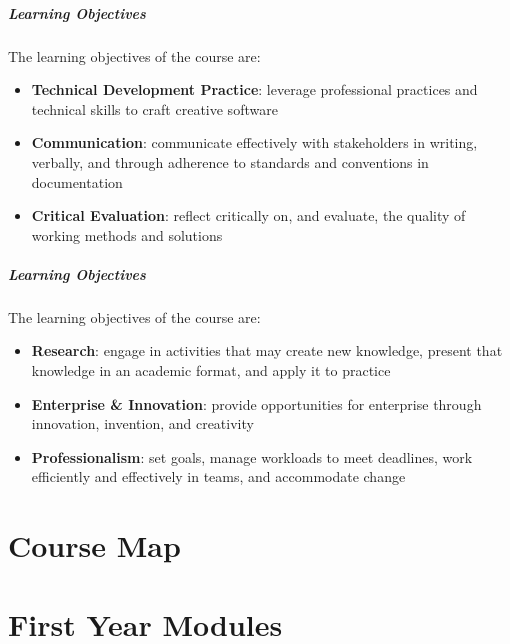 
\begin{frame}
	\frametitle{Learning Objectives}
	
	The learning objectives of the course are:
	
	\begin{itemize}
		\item \textbf{Technical Development Practice}: leverage professional practices and technical skills to craft creative software \pause
		\item \textbf{Communication}: communicate effectively with stakeholders in writing, verbally, and through adherence to standards and conventions in documentation \pause
		\item \textbf{Critical Evaluation}: reflect critically on, and evaluate, the quality of working methods and solutions
	\end{itemize}
\end{frame}

\begin{frame}
	\frametitle{Learning Objectives}
	
	The learning objectives of the course are:
	
	\begin{itemize}
		\item \textbf{Research}: engage in activities that may create new knowledge, present that knowledge in an academic format, and apply it to practice\pause
		\item \textbf{Enterprise \& Innovation}: provide opportunities for enterprise through innovation, invention, and creativity\pause
		\item \textbf{Professionalism}: set goals, manage workloads to meet deadlines, work efficiently and effectively in teams, and accommodate change
	\end{itemize}
\end{frame}

\part{Course Map}
\frame{\partpage}




\part{First Year Modules}
\frame{\partpage}


